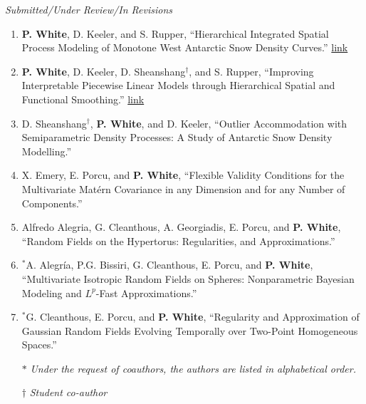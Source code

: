 \documentclass[12pt]{article}
\begin{document}
\emph{Submitted/Under Review/In Revisions}

\begin{enumerate}[label=$\bullet$]
\item \textbf{P. White}, D. Keeler, and S. Rupper, ``Hierarchical Integrated Spatial Process Modeling of Monotone West Antarctic Snow Density Curves.'' \href{https://arxiv.org/abs/2001.05520}{link}
\item \textbf{P. White}, D. Keeler, D. Sheanshang$^\dagger$, and S. Rupper, ``Improving Interpretable Piecewise Linear Models through Hierarchical Spatial and Functional Smoothing.'' \href{https://arxiv.org/abs/2006.09329}{link}
\item D. Sheanshang$^\dagger$, \textbf{P. White}, and D. Keeler, ``Outlier Accommodation with Semiparametric Density Processes: A Study of Antarctic Snow Density Modelling.''
\item X. Emery, E. Porcu, and \textbf{P. White}, ``Flexible Validity Conditions for the Multivariate Mat\'ern Covariance in any Dimension and for any Number of Components.''
\item Alfredo Alegria, G. Cleanthous, A. Georgiadis, E. Porcu, and \textbf{P. White}, ``Random Fields on the Hypertorus: Regularities, and Approximations.'' 
\item $^*$A. Alegr\'ia, P.G. Bissiri, G. Cleanthous, E. Porcu, and \textbf{P. White}, ``Multivariate Isotropic Random  Fields on Spheres: Nonparametric Bayesian Modeling and $L^p$-Fast Approximations.''
\item $^*$G. Cleanthous, E. Porcu, and \textbf{P. White}, ``Regularity and Approximation of Gaussian Random Fields Evolving Temporally over Two-Point Homogeneous Spaces.'' 
\setlength\itemsep{-1em} \\
\item[$*$] \textit{Under the request of coauthors, the authors are listed in alphabetical order.}\\
\item[$\dagger$] \textit{Student co-author}
\end{enumerate}
\end{document}
